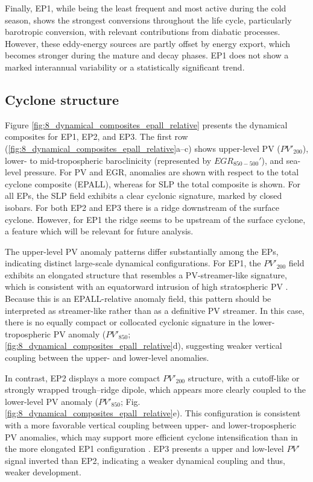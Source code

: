 \documentclass[pdflatex,sn-chicago]{sn-jnl}%
\theoremstyle{plain}
\theoremstyle{definition}
\theoremstyle{remark}
\theoremstyle{definition}
\begin{document}
Finally, EP1, while being the least frequent and most active during the cold season, shows the strongest conversions throughout the life cycle, particularly barotropic conversion, with relevant contributions from diabatic processes. However, these eddy-energy sources are partly offset by energy export, which becomes stronger during the mature and decay phases. EP1 does not show a marked interannual variability or a statistically significant trend.


\subsection{Cyclone structure}\label{sec:composites}

Figure \ref{fig:8_dynamical_composites_epall_relative} presents the dynamical composites for EP1, EP2, and EP3. The first row (\ref{fig:8_dynamical_composites_epall_relative}a--c) shows upper-level PV ($PV'_{200}$), lower- to mid-tropospheric baroclinicity (represented by $EGR_{850-500}'$), and sea-level pressure. For PV and EGR, anomalies are shown with respect to the total cyclone composite (EPALL), whereas for SLP the total composite is shown. For all EPs, the SLP field exhibits a clear cyclonic signature, marked by closed isobars. For both EP2 and EP3 there is a ridge downstream of the surface cyclone. However, for EP1 the ridge seems to be upstream of the surface cyclone, a feature which will be relevant for future analysis. 

The upper-level PV anomaly patterns differ substantially among the EPs, indicating distinct large-scale dynamical configurations. For EP1, the $PV'_{200}$ field exhibits an elongated structure that resembles a PV-streamer-like signature, which is consistent with an equatorward intrusion of high stratospheric PV \citep[e.g.,][]{hoskins1985use,hu2004variations,wernli2007identification}. Because this is an EPALL-relative anomaly field, this pattern should be interpreted as streamer-like rather than as a definitive PV streamer. In this case, there is no equally compact or collocated cyclonic signature in the lower-tropospheric PV anomaly ($PV'_{850}$; \ref{fig:8_dynamical_composites_epall_relative}d), suggesting weaker vertical coupling between the upper- and lower-level anomalies. 

In contrast, EP2 displays a more compact $PV'_{200}$ structure, with a cutoff-like or strongly wrapped trough--ridge dipole, which appears more clearly coupled to the lower-level PV anomaly ($PV'_{850}$; Fig. \ref{fig:8_dynamical_composites_epall_relative}e). This configuration is consistent with a more favorable vertical coupling between upper- and lower-tropospheric PV anomalies, which may support more efficient cyclone intensification than in the more elongated EP1 configuration \citep{davis1991potential,huo1999interaction,schemm2019efficiency}. EP3 presents a upper and low-level $PV'$ signal inverted than EP2, indicating a weaker  dynamical coupling and thus, weaker development. 
\end{document}
